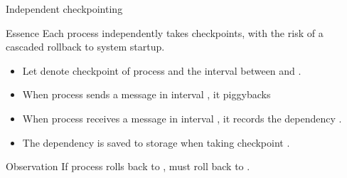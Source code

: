 \begin{slide}{Independent checkpointing}
  \begin{block}{Essence}
    Each process independently takes checkpoints, with the risk of a cascaded rollback to system startup.
    \begin{itemize}
    \item Let  denote  checkpoint of process  and
       the interval between  and .
    \item When process  sends a message in interval , it piggybacks 
    \item When process  receives a message in interval , it records the dependency
       \mathexpr{\rightarrow} .
    \item The dependency  \mathexpr{\rightarrow}  is saved to storage when taking
      checkpoint .
    \end{itemize}
  \end{block}
  \onslide
  \begin{block}{Observation} 
    If process  rolls back to ,  must roll back to . 
  \end{block}
\end{slide}
